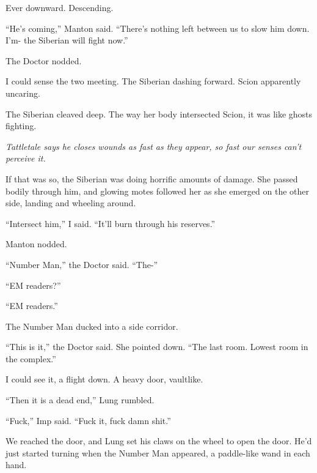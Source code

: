 Ever downward.  Descending.



``He's coming,'' Manton said.  ``There's nothing left between us to slow him down.  I'm- the Siberian will fight now.''



The Doctor nodded.



I could sense the two meeting.  The Siberian dashing forward.  Scion apparently uncaring.



The Siberian cleaved deep.  The way her body intersected Scion, it was like ghosts fighting.



\emph{Tattletale says he closes wounds as fast as they appear, so fast our senses can't perceive it.}



If that was so, the Siberian was doing horrific amounts of damage.  She passed bodily through him, and glowing motes followed her as she emerged on the other side, landing and wheeling around.



``Intersect him,'' I said.  ``It'll burn through his reserves.''



Manton nodded.



``Number Man,'' the Doctor said.  ``The-''



``EM readers?''



``EM readers.''



The Number Man ducked into a side corridor.



``This is it,'' the Doctor said.  She pointed down.  ``The last room.  Lowest room in the complex.''



I could see it, a flight down.  A heavy door, vaultlike.



``Then it is a dead end,'' Lung rumbled.



``Fuck,'' Imp said.  ``Fuck it, fuck damn shit.''



We reached the door, and Lung set his claws on the wheel to open the door.  He'd just started turning when the Number Man appeared, a paddle-like wand in each hand.



